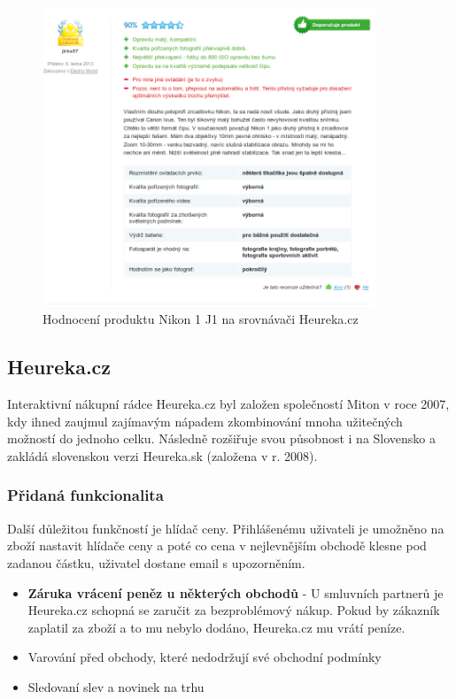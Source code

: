 \begin{figure}[htb]
\begin{center}
\includegraphics[width=100mm]{./pictures/heureka-hodnoceni-produktu.png}
\caption{Hodnocení produktu Nikon 1 J1 na srovnávači Heureka.cz}
\label{fig:heureka-hodnoceni-produktu}
\end{center}
\end{figure}

\subsection{Heureka.cz}
Interaktivní nákupní rádce Heureka.cz byl založen společností Miton v roce 2007, kdy ihned zaujmul zajímavým nápadem zkombinování mnoha užitečných možností do jednoho celku. Následně rozšiřuje svou působnost i na Slovensko a zakládá slovenskou verzi Heureka.sk (založena v r. 2008). \cite{website:wiki:heureka}

\subsubsection{Přidaná funkcionalita}
Další důležitou funkčností je hlídač ceny. Přihlášenému uživateli je umožněno na zboží nastavit hlídače ceny a poté co cena v nejlevnějším obchodě klesne pod zadanou částku, uživatel dostane email s upozorněním.

\begin{itemize}
\item \textbf{Záruka vrácení peněz u některých obchodů} - U smluvních partnerů je Heureka.cz schopná se zaručit za bezproblémový nákup. Pokud by zákazník zaplatil za zboží a to mu nebylo dodáno, Heureka.cz mu vrátí peníze.
\item Varování před obchody, které nedodržují své obchodní podmínky
\item Sledovaní slev a novinek na trhu
\end{itemize}

